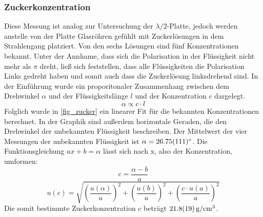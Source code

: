 \documentclass[
	a4paper,
	12pt,
	pagesize,
	ngerman
]{scrartcl}
\begin{document}
	\subsubsection{Zuckerkonzentration}
	Diese Messung ist analog zur Untersuchung der $\lambda/2$-Platte, jedoch werden anstelle von der Platte Glasröhren gefühlt mit Zuckerlösungen in dem Strahlengang platziert.
	Von den sechs Lösungen sind fünf Konzentrationen bekannt.
	Unter der Annhame, dass sich die Polarisation in der Flüssigkeit nicht mehr als $\pi$ dreht, ließ sich feststellen, dass alle Flüssigkeiten die Polarisation Links gedreht haben und somit auch dass die Zuckerlösung linksdrehend sind.
	In der Einführung wurde ein proporitonaler Zusammenhang zwischen dem Drehwinkel $\alpha$ und der Flüssigkeitslänge $l$ und der Konzentration $c$ dargelegt.
	\begin{equation}
		\alpha \propto c \cdot l
	\end{equation}
	Folglich wurde in \cref{fig_zucker} ein linearer Fit für die bekannten Konzentrationen berechnet.
	In der Graphik sind außerdem horizontale Geraden, die den Drehwinkel der unbekannten Flüssigkeit beschreiben.
	Der Mittelwert der vier Messungen der unbekannten Flüssigkeit ist $\alpha=\SI{26,75+-1,11}{\degree}$.
	Die Funktionsgleichung $ax+b=\alpha$ lässt sich nach x, also der Konzentration, umformen:
	\begin{equation}
		c = \frac{\alpha-b}{a}
	\end{equation}
	\begin{equation}
		u(c) = \sqrt{ \left(\frac{u(\alpha)}{a}\right)^2 + \left(\frac{u(b)}{a}\right)^2 + \left(\frac{c \cdot u(a)}{a}\right)^2}
	\end{equation}
	Die somit bestimmte Zuckerkonzentration $c$ beträgt $\SI{21,8+-1,9}{g/cm^3}$.
\end{document}
